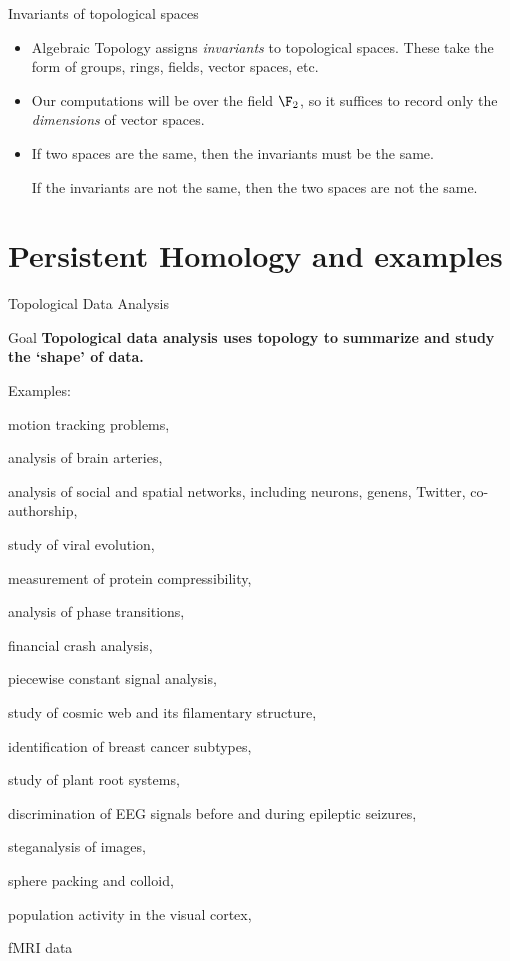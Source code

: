 \documentclass[usenames,dvipsnames,aspectratio=1610]{beamer}
\begin{document}
\begin{frame}{Invariants of topological spaces}
  \begin{itemize}
    \item Algebraic Topology assigns {\em invariants} to topological spaces.
      These take the form of groups, rings, fields, vector spaces, etc.
    \item Our computations will be over the field $\F_2$, so it suffices to record
      only the {\em dimensions} of vector spaces. 
    \item If two spaces are the same, then the invariants must be the same. 
      
      If the invariants are not the same, then the two spaces are not the same.
  \end{itemize}
\end{frame}

\section{Persistent Homology and examples}
\begin{frame}{Topological Data Analysis}
  \begin{alertblock}{Goal}
    {\bf Topological data analysis uses topology to summarize and study the
    `shape' of data.}
  \end{alertblock}
  \vspace{-0.1in}
  \pause
  Examples:
  \vspace{-0.1in}
  \begin{itemize}
  \begin{multicols}{2}
  \item motion tracking problems,
  \item analysis of brain arteries,
  \item analysis of social and spatial networks, including neurons, genens, Twitter,
    co-authorship,
  \item study of viral evolution,
  \item measurement of protein compressibility,
  \item analysis of phase transitions,
  \item financial crash analysis,
  \item piecewise constant signal analysis,
  \item study of cosmic web and its filamentary structure,
  \item identification of breast cancer subtypes,
  \item study of plant root systems,
  \item discrimination of EEG signals before and during epileptic seizures,
  \item steganalysis of images,
  \item sphere packing and colloid,
  \item population activity in the visual cortex,
  \item fMRI data
  \end{multicols}

  \end{itemize}
\end{frame}
\end{document}

